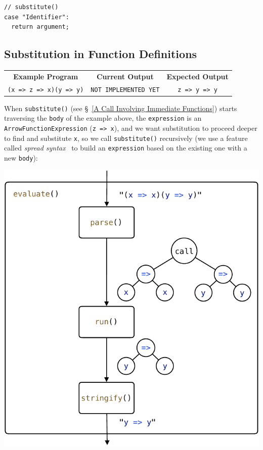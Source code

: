 \documentclass[12pt, oneside]{book}
\begin{document}
\begin{verbatim}
// substitute()
case "Identifier":
  return argument;
\end{verbatim}

\subsection{Substitution in Function Definitions}
\label{Substitution in Function Definitions}

\begin{center}
\begin{tabular}{c|c|c}
\textbf{Example Program} & \textbf{Current Output} & \textbf{Expected Output} \\
\texttt{(x => z => x)(y => y)} & \texttt{NOT IMPLEMENTED YET} & \texttt{z => y => y} \\
\end{tabular}
\end{center}

When \texttt{substitute()} (see §~\ref{A Call Involving Immediate Functions}) starts traversing the \texttt{body} of the example above, the \texttt{expression} is an \texttt{ArrowFunctionExpression} (\texttt{z => x}), and we want substitution to proceed deeper to find and substitute \texttt{x}, so we call \texttt{substitute()} recursively (we use a feature called \emph{spread syntax}~\cite{spread-syntax} to build an \texttt{expression} based on the existing one with a new \texttt{body}):

\begin{center}
\includegraphics[page = 6]{images.pdf}
\end{center}
\end{document}
